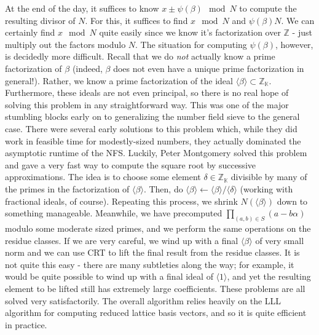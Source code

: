\documentclass[12pt]{article}
\newcommand{\K}{\mathbb{K}}
\newcommand{\Z}{\mathbb{Z}}
\newcommand{\ideal}[1]{{\langle #1 \rangle}}
\begin{document}
  At the end of the day, it suffices to know $x\pm \psi(\beta) \mod N$
  to compute the resulting divisor of $N$. For this, it suffices
  to find $x\mod N$ and $\psi(\beta)N$. We can certainly find
  $x\mod N$ quite easily since we know it's factorization over
  $\Z$ - just multiply out the factors modulo $N$. The situation
  for computing $\psi(\beta)$, however, is decidedly more difficult.
  Recall that we do {\em not} actually know a prime factorization
  of $\beta$ (indeed, $\beta$ does not even have a unique prime
  factorization in general!). Rather, we know a prime factorization
  of the ideal $\ideal{\beta}\subset\Z_\K$. Furthermore, these
  ideals are not even principal, so there is no real hope of
  solving this problem in any straightforward way. This was one
  of the major stumbling blocks early on to generalizing the
  number field sieve to the general case. There were several
  early solutions to this problem which, while they did work
  in feasible time for modestly-sized numbers, they actually
  dominated the asymptotic runtime of the NFS.
  Luckily, Peter Montgomery solved this problem and
  gave a very fast way to compute the square root by successive
  approximations. The idea is to choose some element 
  $\delta\in\Z_\K$ divisible by many of the primes in the
  factorization of $\ideal{\beta}$. Then, do 
  $\ideal{\beta}\gets\ideal{\beta}/\ideal{\delta}$ (working with fractional
  ideals, of course). Repeating this process, we shrink 
  $N(\ideal{\beta})$ down to something manageable. Meanwhile, we
  have precomputed $\prod_{(a,b)\in S}(a-b\alpha)$ modulo some
  moderate sized primes, and we perform the same operations
  on the residue classes. If we are very careful, we wind up with
  a final $\ideal{\beta}$ of very small norm and we can use CRT
  to lift the final result from the residue classes.
  It is not quite
  this easy - there are many subtleties along the way; for example,
  it would be quite possible to wind up with a final ideal of 
  $\ideal{1}$, and yet the resulting element to be lifted still
  has extremely large coefficients. These problems are all solved
  very satisfactorily. The overall algorithm relies heavily 
  on the LLL algorithm for computing reduced lattice basis vectors,
  and so it is quite efficient in practice.
  
\end{document}
